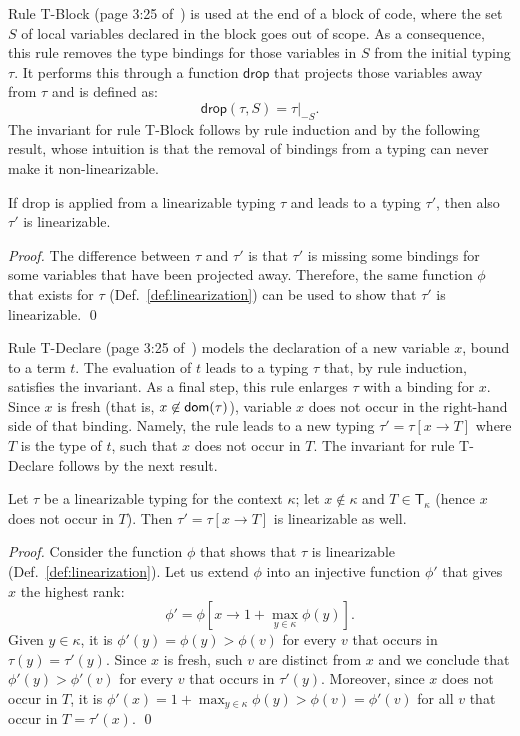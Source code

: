 Rule \textsf{T-Block} (page 3:25 of~\cite{Pearce21}) is used at the end of a
block of code, where the set $S$ of local
variables declared in the block goes out of scope. As a consequence, this rule removes
the type bindings for those variables in $S$ from the initial typing $\tau$. It performs this
through a function $\mathsf{drop}$ that projects those variables away from $\tau$ and is defined as:
\[
\mathsf{drop}(\tau,S)=\tau|_{-S}.
\]
The invariant for rule \textsf{T-Block} follows by rule induction and by the following result,
whose intuition is that the removal of bindings from a typing can never make it
non-linearizable.
%
\begin{lemma}\label{lem:drop_invariant}
  If \textsf{drop} is applied from a linearizable typing $\tau$
  and leads to a typing $\tau'$, then also $\tau'$ is linearizable.
\end{lemma}
\begin{proof}
  The difference between $\tau$ and $\tau'$ is that $\tau'$ is missing some
  bindings for some variables that have been projected away. Therefore,
  the same function $\phi$ that exists for $\tau$ (Def.~\ref{def:linearization})
  can be used to show that $\tau'$ is linearizable.
  \qed
\end{proof}

Rule \textsf{T-Declare} (page 3:25 of~\cite{Pearce21}) models the declaration
of a new variable $x$, bound to a term $t$. The evaluation of $t$ leads to a
typing $\tau$ that, by rule induction, satisfies the invariant. As a final
step, this rule enlarges $\tau$ with a binding for $x$. Since $x$ is
fresh (that is, $x\not\in\mathsf{dom}(\tau)$),
variable $x$ does not occur in the right-hand side of that binding. Namely, the rule
leads to a new typing $\tau'=\tau[x\to T]$ where $T$ is the type of $t$, such that
$x$ does not occur in $T$. The invariant for rule \textsf{T-Declare} follows by the next result.

\begin{lemma}\label{lem:declare_invariant}
  Let $\tau$ be a linearizable typing for the context $\kappa$;
  let $x\not\in\kappa$ and $T\in\mathsf{T}_\kappa$ (hence $x$ does not occur in $T$).
  Then $\tau'=\tau[x\to T]$ is linearizable as well.
\end{lemma}
\begin{proof}
  Consider the function $\phi$ that shows that $\tau$ is linearizable (Def.~\ref{def:linearization}).
  Let us extend $\phi$ into an injective function $\phi'$ that gives $x$ the highest rank:
  \[
  \phi'=\phi\left[x\to 1+\max\limits_{y\in\kappa}\phi(y)\right].
  \]
  Given $y\in\kappa$, it is $\phi'(y)=\phi(y)>\phi(v)$ for every $v$ that occurs
  in $\tau(y)=\tau'(y)$. Since $x$ is fresh, such $v$ are distinct from $x$ and we
  conclude that $\phi'(y)>\phi'(v)$ for every $v$ that occurs in $\tau'(y)$.
  Moreover, since $x$ does not occur in $T$, it is
  $\phi'(x)=1+\max_{y\in\kappa}\phi(y)>\phi(v)=\phi'(v)$ for all $v$ that occur in $T=\tau'(x)$.
  \qed
\end{proof}

